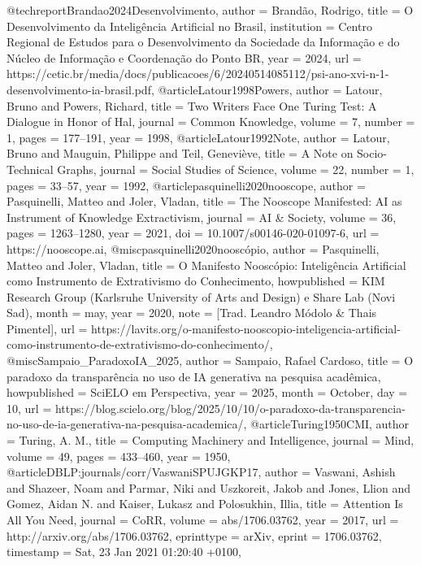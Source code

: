 @techreport{Brandao2024Desenvolvimento,
  author      = {Brandão, Rodrigo},
  title       = {{O Desenvolvimento da Inteligência Artificial no Brasil}},
  institution = {Centro Regional de Estudos para o Desenvolvimento da Sociedade da Informação e do Núcleo de Informação e Coordenação do Ponto BR},
  year        = {2024},
  url         = {https://cetic.br/media/docs/publicacoes/6/20240514085112/psi-ano-xvi-n-1-desenvolvimento-ia-brasil.pdf},
}
@article{Latour1998Powers,
  author  = {Latour, Bruno and Powers, Richard},
  title   = {{Two Writers Face One Turing Test: A Dialogue in Honor of Hal}},
  journal = {{Common Knowledge}},
  volume  = {7},
  number  = {1},
  pages   = {177--191},
  year    = {1998},
}
@article{Latour1992Note,
  author  = {Latour, Bruno and Mauguin, Philippe and Teil, Geneviève},
  title   = {{A Note on Socio-Technical Graphs}},
  journal = {{Social Studies of Science}},
  volume  = {22},
  number  = {1},
  pages   = {33--57},
  year    = {1992},
}
@article{pasquinelli2020nooscope,
  author  = {Pasquinelli, Matteo and Joler, Vladan},
  title   = {{The Nooscope Manifested: AI as Instrument of Knowledge Extractivism}},
  journal = {{AI \& Society}},
  volume  = {36},
  pages   = {1263--1280},
  year    = {2021},
  doi     = {10.1007/s00146-020-01097-6},
  url          = {https://nooscope.ai},
}
@misc{pasquinelli2020nooscópio,
  author       = {Pasquinelli, Matteo and Joler, Vladan},
  title        = {{O Manifesto Nooscópio: Inteligência Artificial como Instrumento de Extrativismo do Conhecimento}},
  howpublished = {KIM Research Group (Karlsruhe University of Arts and Design) e Share Lab (Novi Sad)},
  month        = may,
  year         = {2020},
  note         = {[Trad. Leandro Módolo \& Thais Pimentel]},
  url          = {https://lavits.org/o-manifesto-nooscopio-inteligencia-artificial-como-instrumento-de-extrativismo-do-conhecimento/},
}
@misc{Sampaio_ParadoxoIA_2025,
  author       = {Sampaio, Rafael Cardoso},
  title        = {{O paradoxo da transparência no uso de IA generativa na pesquisa acadêmica}},
  howpublished = {SciELO em Perspectiva},
  year         = {2025},
  month        = {October},
  day          = {10},
  url          = {https://blog.scielo.org/blog/2025/10/10/o-paradoxo-da-transparencia-no-uso-de-ia-generativa-na-pesquisa-academica/},
}
@article{Turing1950CMI,
  author  = {Turing, A. M.},
  title   = {{Computing Machinery and Intelligence}},
  journal = {{Mind}},
  volume  = {49},
  pages   = {433--460},
  year    = {1950},
}
@article{DBLP:journals/corr/VaswaniSPUJGKP17,
  author       = {Vaswani, Ashish and Shazeer, Noam and Parmar, Niki and Uszkoreit, Jakob and Jones, Llion and Gomez, Aidan N. and Kaiser, Lukasz and Polosukhin, Illia},
  title        = {Attention Is All You Need},
  journal      = {CoRR},
  volume       = {abs/1706.03762},
  year         = {2017},
  url          = {http://arxiv.org/abs/1706.03762},
  eprinttype   = {arXiv},
  eprint       = {1706.03762},
  timestamp    = {Sat, 23 Jan 2021 01:20:40 +0100},
}
